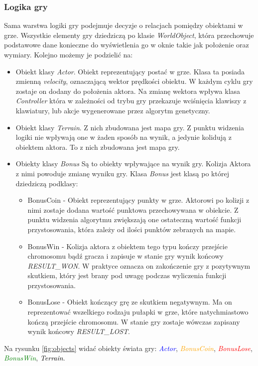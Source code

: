 \subsubsection{Logika gry}
\begin{par}
	Sama warstwa logiki gry podejmuje decyzje o relacjach pomiędzy obiektami w grze.
	Wszystkie elementy gry dziedziczą po klasie \textit{WorldObject}, która przechowuje podstawowe dane konieczne do wyświetlenia go w oknie takie jak położenie oraz wymiary.
	Kolejno możemy je podzielić na:
	\begin{itemize}
		\item Obiekt klasy \textit{Actor}. 
		Obiekt reprezentujący postać w grze. 
		Klasa ta posiada zmienną \textit{velocity}, oznaczającą wektor prędkości obiektu.  
		W każdym cyklu gry zostaje on dodany do położenia aktora.
		Na zmianę wektora wpływa klasa \textit{Controller} która w zależności od trybu gry przekazuje wciśnięcia klawiszy z klawiatury, lub akcje wygenerowane przez algorytm genetyczny.
		\item Obiekt klasy \textit{Terrain}. Z nich zbudowana jest mapa gry. Z punktu widzenia logiki nie wpływają one w żaden sposób na wynik, a jedynie kolidują z obiektem aktora. To z nich zbudowana jest mapa gry.
		\item Obiekty klasy \textit{Bonus}
		Są to obiekty wpływające na wynik gry. Kolizja Aktora z nimi powoduje zmianę wyniku gry. Klasa \textit{Bonus} jest klasą po której dziedziczą podklasy:
		\begin{itemize}
			\item BonusCoin - Obiekt reprezentujący punkty w grze. Aktorowi po kolizji z nimi zostaje dodana wartość punktowa przechowywana w obiekcie. Z punktu widzenia algorytmu zwiększają one ostateczną wartość funkcji przystosowania, która zależy od ilości punktów zebranych na mapie.
			\item BonusWin - Kolizja aktora z obiektem tego typu kończy przejście chromosomu bądź gracza i zapisuje w stanie gry wynik końcowy \textit{RESULT\_WON}. W praktyce oznacza on zakończenie gry z pozytywnym skutkiem, który jest brany pod uwagę podczas wyliczenia funkcji przystosowania.
			\item BonusLose - Obiekt kończący grę ze skutkiem negatywnym. Ma on reprezentować wszelkiego rodzaju pułapki w grze, które natychmiastowo kończą przejście chromosomu. W stanie gry zostaje wówczas zapisany wynik końcowy \textit{RESULT\_LOST}.
		\end{itemize}
	\end{itemize}
	Na rysunku \ref{fig:objects} widać obiekty świata gry: 
	\textcolor{blue}{\textit{Actor}}, 
	\textcolor{orange}{\textit{BonusCoin}},
	\textcolor{red}{\textit{BonusLose}},
	\textcolor{green}{\textit{BonusWin}},
	\textcolor{black}{\textit{Terrain}}.


\end{par}
